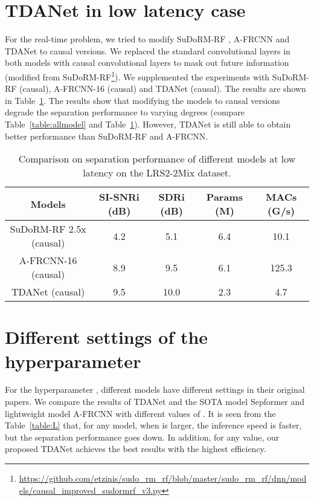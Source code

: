 \documentclass{article} \usepackage{iclr2023_conference,times}
\begin{document}
\section{TDANet in low latency case}
\label{sec:a-causal}
For the real-time problem, we tried to modify SuDoRM-RF \citep{tzinis2020sudo}, A-FRCNN \citep{hu2021speech} and TDANet to causal versions. We replaced the standard convolutional layers in both models with causal convolutional layers to mask out future information (modified from SuDoRM-RF\footnote{\url{https://github.com/etzinis/sudo_rm_rf/blob/master/sudo_rm_rf/dnn/models/causal_improved_sudormrf_v3.py}}). We supplemented the experiments with SuDoRM-RF (causal), A-FRCNN-16 (causal) and TDANet (causal). 
The results are shown in Table~\ref{table:causal}. The results show that modifying the models to causal versions degrade the separation performance to varying degrees (compare Table~\ref{table:allmodel} and Table~\ref{table:causal}). However, TDANet is still able to obtain better performance than SuDoRM-RF and A-FRCNN.

\begin{table}[ht]
\caption{Comparison on separation performance of different models at low latency on the LRS2-2Mix dataset.}
\label{table:causal}
\begin{center}
\begin{tabular}{ccccc}
\toprule
Models & SI-SNRi (dB) & SDRi (dB) & Params (M) & MACs (G/s) \\
\midrule
SuDoRM-RF 2.5x (causal) & 4.2 & 5.1 & 6.4 & 10.1 \\
A-FRCNN-16 (causal) & 8.9 & 9.5 & 6.1 & 125.3 \\ 
TDANet (causal) & 9.5 & 10.0 & 2.3 & 4.7 \\
\bottomrule
\end{tabular}
\end{center}
\end{table}

\section{Different settings of the hyperparameter }
\label{sec:a-L}
For the hyperparameter , different models have different settings in their original papers. We compare the results of TDANet and the SOTA model Sepformer and lightweight model A-FRCNN with different values of . It is seen from the Table~\ref{table:L} that, for any model, when  is larger, the inference speed is faster, but the separation performance goes down. In addition, for any  value, our proposed TDANet achieves the best results with the highest efficiency.
\end{document}
